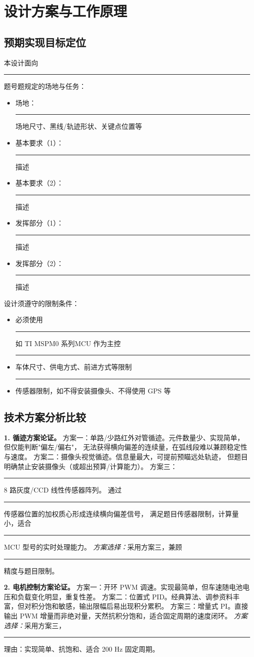 \documentclass[12pt,a4paper,fontset=fandol]{ctexart}
\newcommand{\blank}{\rule{4cm}{0.4pt}}   %
\begin{document}
\section{设计方案与工作原理}

\subsection{预期实现目标定位}
本设计面向\blank{题号}题规定的场地与任务：
\begin{itemize}
  \item 场地：\blank{场地尺寸、黑线/轨迹形状、关键点位置等}
  \item 基本要求（1）：\blank{描述}
  \item 基本要求（2）：\blank{描述}
  \item 发挥部分（1）：\blank{描述}
  \item 发挥部分（2）：\blank{描述}
\end{itemize}
设计须遵守的限制条件：
\begin{itemize}
  \item 必须使用\blank{如 TI MSPM0 系列}MCU 作为主控
  \item \blank{车体尺寸、供电方式、前进方式等限制}
  \item \blank{传感器限制，如不得安装摄像头、不得使用 GPS 等}
\end{itemize}

\subsection{技术方案分析比较}

\textbf{1. 循迹方案论证。}
方案一：单路/少路红外对管循迹。元件数量少、实现简单，但仅能判断"偏左/偏右"，
无法获得横向偏差的连续量，在弧线段难以兼顾稳定性与速度。
方案二：摄像头视觉循迹。信息量最大，可提前预瞄远处轨迹，
但题目明确禁止安装摄像头（或超出预算/计算能力）。
方案三：\blank{8 路灰度/CCD 线性传感器阵列}。
通过\blank{传感器位置的加权质心}形成连续横向偏差信号，
满足题目传感器限制，计算量小，适合\blank{MCU 型号}的实时处理能力。
\emph{方案选择：}采用方案三，兼顾\blank{精度与题目限制}。

\textbf{2. 电机控制方案论证。}
方案一：开环 PWM 调速。实现最简单，但车速随电池电压和负载变化明显，重复性差。
方案二：位置式 PID。经典算法、调参资料丰富，但对积分饱和敏感，输出限幅后易出现积分累积。
方案三：增量式 PI。直接输出 PWM 增量而非绝对量，天然抗积分饱和，适合固定周期的速度闭环。
\emph{方案选择：}采用方案三，\blank{理由：实现简单、抗饱和、适合 200 Hz 固定周期}。
\end{document}
